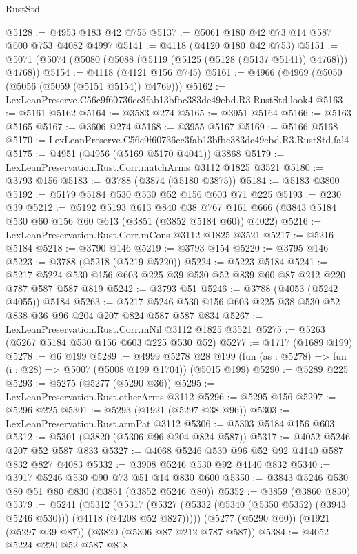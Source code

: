 \begin{lexlean}{RustStd}
\begin{coremodule}
@5128 := @4953 @183 @42 @755
@5137 := @5061 @180 @42 @73 @14 @587 @600 @753 @4082 @4997
@5141 := @4118 (@4120 @180 @42 @753)
@5151 := @5071 (@5074 (@5080 (@5088 (@5119 (@5125 (@5128 (@5137 @5141)) @4768))) @4768))
@5154 := @4118 (@4121 @156 @745)
@5161 := @4966 (@4969 (@5050 (@5056 (@5059 (@5151 @5154)) @4769)))
@5162 := LexLeanPreserve.C56c9f60736cc3fab13bfbc383dc49ebd.R3.RustStd.look4
@5163 := @5161 @5162
@5164 := @3583 @274
@5165 := @3951 @5164
@5166 := @5163 @5165
@5167 := @3606 @274
@5168 := @3955 @5167
@5169 := @5166 @5168
@5170 := LexLeanPreserve.C56c9f60736cc3fab13bfbc383dc49ebd.R3.RustStd.fal4
@5175 := @4951 (@4956 (@5169 @5170 @4041)) @3868
@5179 := LexLeanPreservation.Rust.Corr.matchArms @3112 @1825 @3521
@5180 := @3793 @156
@5183 := @3788 (@3874 (@5180 @3875))
@5184 := @5183 @3800
@5192 := @5179 @5184 @530 @530 @52 @156 @603 @71 @225
@5193 := @230 @39
@5212 := @5192
    @5193
    @613
    @840
    @38
    @767
    @161
    @666
    (@3843 @5184 @530 @60 @156 @60 @613 (@3851 (@3852 @5184 @60)) @4022)
@5216 := LexLeanPreservation.Rust.Corr.mCons @3112 @1825 @3521
@5217 := @5216 @5184
@5218 := @3790 @146
@5219 := @3793 @154
@5220 := @3795 @146
@5223 := @3788 (@5218 (@5219 @5220))
@5224 := @5223 @5184
@5241 := @5217 @5224 @530 @156 @603 @225 @39 @530 @52 @839 @60 @87 @212 @220 @787 @587 @587 @819
@5242 := @3793 @51
@5246 := @3788 (@4053 (@5242 @4055)) @5184
@5263 := @5217 @5246 @530 @156 @603 @225 @38 @530 @52 @838 @36 @96 @204 @207 @824 @587 @587 @834
@5267 := LexLeanPreservation.Rust.Corr.mNil @3112 @1825 @3521
@5275 := @5263 (@5267 @5184 @530 @156 @603 @225 @530 @52)
@5277 := @1717 (@1689 @199)
@5278 := @6 @199
@5289 := @4999
    @5278
    @28
    @199
    (fun (as : @5278) => fun (i : @28) => @5007 (@5008 @199 @1704))
    (@5015 @199)
@5290 := @5289 @225
@5293 := @5275 (@5277 (@5290 @36))
@5295 := LexLeanPreservation.Rust.otherArms @3112
@5296 := @5295 @156
@5297 := @5296 @225
@5301 := @5293 (@1921 (@5297 @38 @96))
@5303 := LexLeanPreservation.Rust.armPat @3112
@5306 := @5303 @5184 @156 @603
@5312 := @5301 (@3820 (@5306 @96 @204 @824 @587))
@5317 := @4052 @5246 @207 @52 @587 @833
@5327 := @4068 @5246 @530 @96 @52 @92 @4140 @587 @832 @827 @4083
@5332 := @3908 @5246 @530 @92 @4140 @832
@5340 := @3917 @5246 @530 @90 @73 @51 @14 @830 @600
@5350 := @3843 @5246 @530 @80 @51 @80 @830 (@3851 (@3852 @5246 @80))
@5352 := @3859 (@3860 @830)
@5379 := @5241
    (@5312
      (@5317 (@5327 (@5332 (@5340 (@5350 @5352) (@3943 @5246 @530))) (@4118 (@4208 @52 @827)))))
    (@5277 (@5290 @60))
    (@1921 (@5297 @39 @87))
    (@3820 (@5306 @87 @212 @787 @587))
@5384 := @4052 @5224 @220 @52 @587 @818

\end{coremodule}
\end{lexlean}
